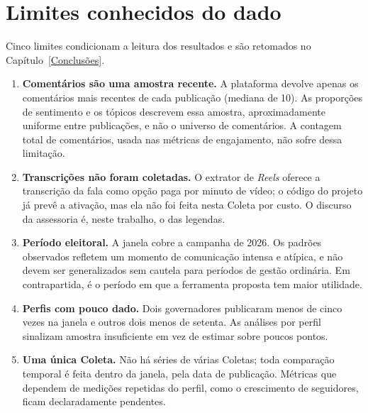\section{Limites conhecidos do dado}\label{sec:limites-dado}

Cinco limites condicionam a leitura dos resultados e são retomados no Capítulo~\ref{Conclusões}.

\begin{enumerate}
    \item \textbf{Comentários são uma amostra recente.} A plataforma devolve apenas os comentários mais recentes de cada publicação (mediana de 10). As proporções de sentimento e os tópicos descrevem essa amostra, aproximadamente uniforme entre publicações, e não o universo de comentários. A contagem total de comentários, usada nas métricas de engajamento, não sofre dessa limitação.
    \item \textbf{Transcrições não foram coletadas.} O extrator de \emph{Reels} oferece a transcrição da fala como opção paga por minuto de vídeo; o código do projeto já prevê a ativação, mas ela não foi feita nesta Coleta por custo. O discurso da assessoria é, neste trabalho, o das legendas.
    \item \textbf{Período eleitoral.} A janela cobre a campanha de 2026. Os padrões observados refletem um momento de comunicação intensa e atípica, e não devem ser generalizados sem cautela para períodos de gestão ordinária. Em contrapartida, é o período em que a ferramenta proposta tem maior utilidade.
    \item \textbf{Perfis com pouco dado.} Dois governadores publicaram menos de cinco vezes na janela e outros dois menos de setenta. As análises por perfil sinalizam amostra insuficiente em vez de estimar sobre poucos pontos.
    \item \textbf{Uma única Coleta.} Não há séries de várias Coletas; toda comparação temporal é feita dentro da janela, pela data de publicação. Métricas que dependem de medições repetidas do perfil, como o crescimento de seguidores, ficam declaradamente pendentes.
\end{enumerate}
